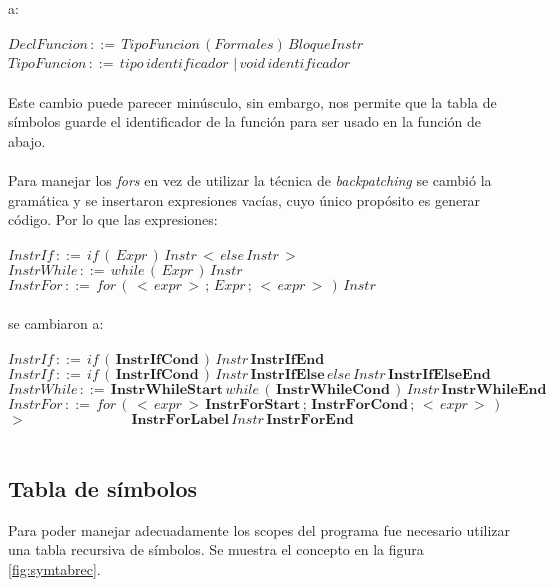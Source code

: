 \documentclass[11pt]{article}
\begin{document}
\\\\
a:
\\\\
$DeclFuncion\,::=\,TipoFuncion\,(Formales)\,BloqueInstr$
\\
$TipoFuncion\,::=\,tipo\,identificador$
$|\,void\,identificador$
\\\\
Este cambio puede parecer minúsculo, sin embargo, nos permite que la tabla de símbolos guarde el identificador de la función para ser usado en la función de abajo.
\\\\
Para manejar los \textit{fors} en vez de utilizar la técnica de \textit{backpatching} se cambió la gramática y se insertaron expresiones vacías, cuyo único propósito es generar código. Por lo que las expresiones:
\\\\
$InstrIf\,::=\,if\,(\,Expr\,)\,Instr\,<\,else\,Instr\,>$
\\
$InstrWhile\,::=\,while\,(\,Expr\,)\,Instr$
\\
$InstrFor\,::=\,for\,(\,<\,expr\,>\,;\,Expr\,;\,<\,expr\,>\,)\,Instr$
\\\\
se cambiaron a:
\\\\
$InstrIf\,::=\,if\,(\,\mathbf{InstrIfCond}\,)\,Instr\,\mathbf{InstrIfEnd}$
\\
$InstrIf\,::=\,if\,(\,\mathbf{InstrIfCond}\,)\,Instr\,\mathbf{InstrIfElse}\,else\,Instr\,\mathbf{InstrIfElseEnd}$
\\
$InstrWhile\,::=\,\mathbf{InstrWhileStart}\,while\,(\,\mathbf{InstrWhileCond}\,)\,Instr\,\mathbf{InstrWhileEnd}$
\\
$InstrFor\,::=\,for\,(\,<\,expr\,>\,\mathbf{InstrForStart}\,;\,\mathbf{InstrForCond}\,;\,<\,expr\,>\,)$
\\
$>\,\,\,\,\,\,\,\,\,\,\,\,\,\,\,\,\,\,\,\,\,\,\,\,\,\,\,\,\,\,\,\,\,\,\,\,\,\,\,\,\,\,\,\,\,\mathbf{InstrForLabel}\,Instr\,\mathbf{InstrForEnd}$
\\\\

\subsection{Tabla de símbolos}

Para poder manejar adecuadamente los scopes del programa fue necesario utilizar una tabla recursiva de símbolos. Se muestra el 
concepto en la figura \ref{fig:symtabrec}.
\end{document}
